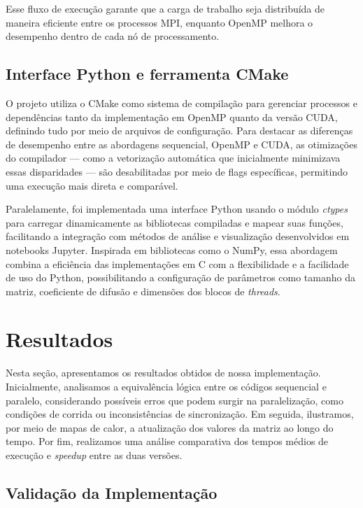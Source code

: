 \documentclass[12pt]{article}
\begin{document}
Esse fluxo de execução garante que a carga de trabalho seja distribuída de
maneira eficiente entre os processos MPI, enquanto OpenMP melhora o desempenho
dentro de cada nó de processamento.

\subsection{Interface Python e ferramenta CMake}

O projeto utiliza o CMake como sistema de compilação para gerenciar processos e
dependências tanto da implementação em OpenMP quanto da versão CUDA, definindo
tudo por meio de arquivos de configuração. Para destacar as diferenças de
desempenho entre as abordagens sequencial, OpenMP e CUDA, as otimizações do
compilador — como a vetorização automática que inicialmente minimizava essas
disparidades — são desabilitadas por meio de flags específicas, permitindo uma
execução mais direta e comparável.

Paralelamente, foi implementada uma interface Python usando o módulo
\textit{ctypes} para carregar dinamicamente as bibliotecas compiladas e mapear
suas funções, facilitando a integração com métodos de análise e visualização
desenvolvidos em notebooks Jupyter. Inspirada em bibliotecas como o NumPy, essa
abordagem combina a eficiência das implementações em C com a flexibilidade e a
facilidade de uso do Python, possibilitando a configuração de parâmetros como
tamanho da matriz, coeficiente de difusão e dimensões dos blocos de
\textit{threads}.

\section{Resultados}

Nesta seção, apresentamos os resultados obtidos de nossa implementação.
Inicialmente, analisamos a equivalência lógica entre os códigos sequencial e
paralelo, considerando possíveis erros que podem surgir na paralelização, como
condições de corrida ou inconsistências de sincronização. Em seguida,
ilustramos, por meio de mapas de calor, a atualização dos valores da matriz ao
longo do tempo. Por fim, realizamos uma análise comparativa dos tempos médios
de execução e \textit{speedup} entre as duas versões.

\subsection{Validação da Implementação}
\end{document}
